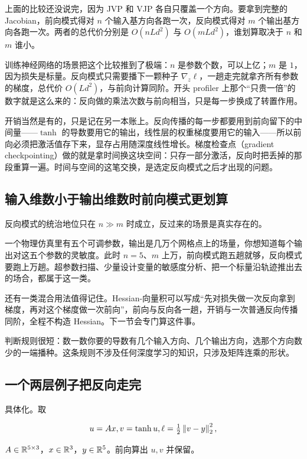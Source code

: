上面的比较还没说完，因为 JVP 和 VJP 各自只覆盖一个方向。要拿到完整的 Jacobian，前向模式得对 \(n\) 个输入基方向各跑一次，反向模式得对 \(m\) 个输出基方向各跑一次。两者的总代价分别是 \(O(nLd^2)\) 与 \(O(mLd^2)\)，谁划算取决于 \(n\) 和 \(m\) 谁小。

训练神经网络的场景把这个比较推到了极端：\(n\) 是参数个数，可以上亿；\(m\) 是 \(1\)，因为损失是标量。反向模式只需要播下一颗种子 \(\nabla_z\ell\)，一趟走完就拿齐所有参数的梯度，总代价 \(O(Ld^2)\)，与前向计算同阶。开头 profiler 上那个``只贵一倍''的数字就是这么来的：反向做的乘法次数与前向相当，只是每一步换成了转置作用。

开销当然是有的，只是记在另一本账上。反向传播的每一步都要用到前向留下的中间量——\(\tanh\) 的导数要用它的输出，线性层的权重梯度要用它的输入——所以前向必须把激活值存下来，显存占用随深度线性增长。梯度检查点（gradient checkpointing）做的就是拿时间换这块空间：只存一部分激活，反向时把丢掉的那段重算一遍。时间与空间的这笔交换，是选定反向模式之后才出现的问题。

\subsection{输入维数小于输出维数时前向模式更划算}

反向模式的统治地位只在 \(n\gg m\) 时成立，反过来的场景是真实存在的。

一个物理仿真里有五个可调参数，输出是几万个网格点上的场量，你想知道每个输出对这五个参数的灵敏度。此时 \(n=5\)、\(m\) 上万，前向模式跑五趟就够，反向模式要跑上万趟。超参数扫描、少量设计变量的敏感度分析、把一个标量沿轨迹推出去的场合，都属于这一类。

还有一类混合用法值得记住。Hessian-向量积可以写成``先对损失做一次反向拿到梯度，再对这个梯度做一次前向''，前向与反向各一趟，开销与一次普通反向传播同阶，全程不构造 Hessian。下一节会专门算这件事。

判断规则很短：数一数你要的导数有几个输入方向、几个输出方向，选那个方向数少的一端播种。这条规则不涉及任何深度学习的知识，只涉及矩阵连乘的形状。

\subsection{一个两层例子把反向走完}

具体化。取

\[
u=Ax,\space v=\tanh u,\space \ell=\tfrac12\left\lVert v-y\right\rVert_2^2,
\]

\(A\in\mathbb{R}^{5\times 3}\)，\(x\in\mathbb{R}^3\)，\(y\in\mathbb{R}^5\)。前向算出 \(u,v\) 并保留。

